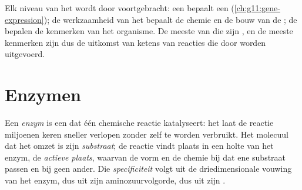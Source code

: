 \begin{proposition}\label{prop:g11:enzymes-and-phenotype:proteins}
Elk niveau van het  wordt door  voortgebracht: een 
bepaalt een  (\cref{ch:g11:gene-expression}); de werkzaamheid van
het  bepaalt de chemie en de bouw van de ; de  bepalen de
kenmerken van het organisme. De meeste van die  zijn
\emph{}, en de meeste kenmerken zijn dus de uitkomst van ketens
van reacties die door  worden uitgevoerd.
\end{proposition}
\admitted

\section{Enzymen}

\begin{definition}\label{def:g11:enzymes-and-phenotype:enzyme}
Een \emph{enzym} is een  dat één chemische reactie
katalyseert: het laat de reactie miljoenen keren sneller verlopen zonder
zelf te worden verbruikt. Het molecuul dat het omzet is zijn
\emph{substraat}; de reactie vindt plaats in een holte
van het enzym, de \emph{actieve plaats}, waarvan de
vorm en de chemie bij dat ene substraat passen en bij geen ander. Die
\emph{specificiteit} volgt uit de driedimensionale vouwing van het enzym,
dus uit zijn aminozuurvolgorde, dus uit zijn .
\end{definition}

